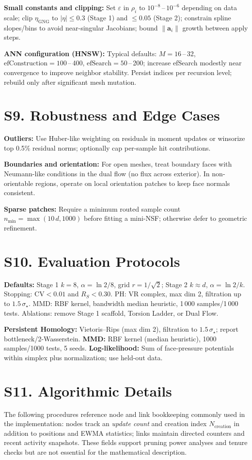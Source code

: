 \documentclass[11pt]{article}
\begin{document}
\textbf{Small constants and clipping:} Set $\varepsilon$ in $\rho_i$ to $10^{-8}$\,–\,$10^{-6}$ depending on data scale; clip $\eta_{\mathrm{GNG}}$ to $\lvert\eta\rvert\le 0.3$ (Stage 1) and $\le 0.05$ (Stage 2); constrain spline slopes/bins to avoid near-singular Jacobians; bound $\lVert\mathbf a_i\rVert$ growth between apply steps.

\textbf{ANN configuration (HNSW):} Typical defaults: $M{=}16$\,–\,32, $\mathrm{efConstruction}{=}100$\,–\,400, $\mathrm{efSearch}{=}50$\,–\,200; increase efSearch modestly near convergence to improve neighbor stability. Persist indices per recursion level; rebuild only after significant mesh mutation.

\section*{S9. Robustness and Edge Cases}
\textbf{Outliers:} Use Huber-like weighting on residuals in moment updates or winsorize top 0.5\% residual norms; optionally cap per-sample hit contributions.

\textbf{Boundaries and orientation:} For open meshes, treat boundary faces with Neumann-like conditions in the dual flow (no flux across exterior). In non-orientable regions, operate on local orientation patches to keep face normals consistent.

\textbf{Sparse patches:} Require a minimum routed sample count $n_{\min}=\max(10\,d, 1000)$ before fitting a mini-NSF; otherwise defer to geometric refinement.

\section*{S10. Evaluation Protocols}
\textbf{Defaults:} Stage 1 $k{=}8$, $\alpha{=}\ln 2/8$, grid $r{=}1/\sqrt{2}$; Stage 2 $k{\approx}d$, $\alpha{=}\ln 2/k$. Stopping: CV$<0.01$ and $R_S{<}0.30$. PH: VR complex, max dim 2, filtration up to $1.5\,\sigma_\star$. MMD: RBF kernel, bandwidth median heuristic, 1\,000 samples/1\,000 tests. Ablations: remove Stage 1 scaffold, Torsion Ladder, or Dual Flow.

\textbf{Persistent Homology:} Vietoris–Rips (max dim 2), filtration to $1.5\,\sigma_\star$; report bottleneck/2-Wasserstein.
\textbf{MMD:} RBF kernel (median heuristic), 1000 samples/1000 tests, 5 seeds.
\textbf{Log-likelihood:} Sum of face-pressure potentials within simplex plus normalization; use held-out data.

\section*{S11. Algorithmic Details}
The following procedures reference node and link bookkeeping commonly used in the implementation: nodes track an \emph{update count} and creation index $N_{\mathrm{creation}}$ in addition to positions and EWMA statistics; links maintain directed counters and recent activity snapshots. These fields support pruning power analyses and tenure checks but are not essential for the mathematical description.
\end{document}
